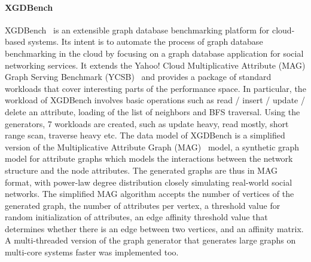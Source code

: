 \paragraph{XGDBench} XGDBench~\cite{Dayarathna:2014:GDB:2676904.2676939} is an extensible graph database benchmarking platform for cloud-based systems. Its intent is to automate
the process of graph database benchmarking in the cloud by focusing on a graph database application for social networking services. It extends the Yahoo! Cloud Multiplicative Attribute (MAG) Graph Serving Benchmark (YCSB)~\cite{Cooper:2010:BCS:1807128.1807152} and \iffalse consists of of a workload generator client and\fi provides a package of standard workloads that cover interesting parts of the performance space.
\iffalse In particular, the workload generator of YCSB supports definition of new workload types.\fi In particular, the workload of XGDBench involves basic operations such as read / insert / update / delete an attribute, loading of the list of neighbors and BFS traversal. Using the generators, 7 workloads are created, such as update heavy, read mostly, short range scan, traverse heavy etc.
The data model of XGDBench is a simplified version of the Multiplicative Attribute Graph (MAG)~\cite{Kim2010} model, a synthetic graph model for attribute graphs which models the interactions between the network structure and the node attributes.
The generated graphs are thus in MAG format, with power-law degree distribution closely simulating real-world social networks.
The simplified MAG algorithm accepts the number of vertices of the generated graph, the number of attributes per vertex, a threshold value for random initialization of attributes, an edge affinity threshold value that determines whether there is an edge between two vertices, and an affinity matrix. \iffalse It has been proven that MAG generates graphs with both analytically tractable and statistically interesting properties.\fi A multi-threaded version of the graph generator that generates large graphs on multi-core systems faster was implemented too.


